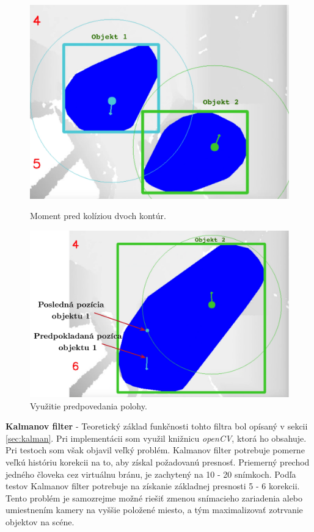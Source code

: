\begin{figure}[H]
  \centering
  \begin{minipage}[b]{0.4\textwidth}
    \includegraphics[width=\textwidth]{images/beforeCollision}
    \caption{Moment pred kolíziou dvoch kontúr.}
  \end{minipage}
  \hfill
  \begin{minipage}[b]{0.55\textwidth}
    \includegraphics[width=\textwidth]{images/predicate}
    \caption{Využitie predpovedania polohy.}
  \end{minipage}
\end{figure}



\textbf{Kalmanov filter} - Teoretický základ funkčnosti tohto filtra bol opísaný v sekcii \ref{sec:kalman}. Pri implementácii som využil knižnicu \textit{openCV}, ktorá ho obsahuje. Pri testoch som však objavil veľký problém. Kalmanov filter potrebuje pomerne veľkú históriu korekcii na to, aby získal požadovanú presnosť. Priemerný prechod jedného človeka cez virtuálnu bránu, je zachytený na 10 - 20 snímkoch. Podľa testov Kalmanov filter potrebuje na získanie základnej presnosti 5 - 6 korekcii. Tento problém je samozrejme možné riešiť zmenou snímacieho zariadenia alebo umiestnením kamery na vyššie položené miesto, a tým maximalizovať zotrvanie objektov na scéne. 

